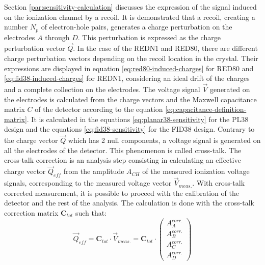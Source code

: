 Section \ref{par:sensitivity-calculation} discusses the expression of the signal induced on the ionization channel by a recoil. It is demonstrated that a recoil, creating a number $N_p$ of electron-hole pairs, generates a charge perturbation on the electrodes $A$ through $D$. This perturbation is expressed as the charge perturbation vector $\vec{Q}$. In the case of the REDN1 and RED80, there are different charge perturbation vectors depending on the recoil location in the crystal. Their expressions are displayed in equation \ref{eq:red80-induced-charges} for RED80 and \ref{eq:fid38-induced-charges} for REDN1, considering an ideal drift of the charges and a complete collection on the electrodes.
The voltage signal $\vec{V}$ generated on the electrodes is calculated from the charge vectors and the Maxwell capacitance matrix $C$ of the detector according to the equation \ref{eq:capacitance-definition-matrix}. It is calculated in the equations \ref{eq:planar38-sensitivity} for the PL38 design and the equations \ref{eq:fid38-sensitivity} for the FID38 design. Contrary to the charge vector $\vec{Q}$ which has 2 null components, a voltage signal is generated on all the electrodes of the detector. This phenomenon is called cross-talk.
The cross-talk correction is an analysis step consisting in calculating an effective charge vector $\vec{Q}_{eff}$ from the amplitude $A_{CH}$ of the measured ionization voltage signals, corresponding to the measured voltage vector $\vec{V}_{meas.}$. With cross-talk corrected measurement, it is possible to proceed with the calibration of the detector and the rest of the analysis.
The calculation is done with the cross-talk correction matrix $\bm{C}_{tot}$
such that:
\begin{equation}
\label{fig:cross-talk-correction}
\vec{Q}_{eff} = \bm{C}_{tot} \cdot \vec{V}_{meas.} =
\bm{C}_{tot} \cdot
\begin{pmatrix}
A_A^{corr.} \\ A_B^{corr.} \\ A_C^{corr.} \\ A_D^{corr.}
\end{pmatrix}
\end{equation}
